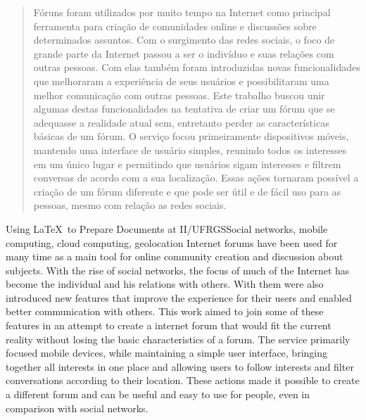 \documentclass[diss]{template/setrem}
\begin{document}
\begin{abstract}
Fóruns foram utilizados por muito tempo na Internet como principal ferramenta para criação de comunidades online e discussões sobre determinados assuntos. Com o surgimento das redes sociais, o foco de grande parte da Internet passou a ser o indivíduo e suas relações com outras pessoas. Com elas também foram introduzidas novas funcionalidades que melhoraram a experiência de seus usuários e possibilitaram uma melhor comunicação com outras pessoas. Este trabalho buscou unir algumas destas funcionalidades na tentativa de criar um fórum que se adequasse a realidade atual sem, entretanto perder as características básicas de um fórum. O serviço focou primeiramente dispositivos móveis, mantendo uma interface de usuário simples, reunindo todos os interesses em um único lugar e permitindo que usuários sigam interesses e filtrem conversas de acordo com a sua localização. Essas ações tornaram possível a criação de um fórum diferente e que pode ser útil e de fácil uso para as pessoas, mesmo com relação as redes sociais.
\end{abstract}


\begin{englishabstract}{Using \LaTeX\ to Prepare Documents at II/UFRGS}{Social networks, mobile computing, cloud computing, geolocation}
Internet forums have been used for many time as a main tool for online community creation and discussion about subjects. With the rise of social networks, the focus of much of the Internet has become the individual and his relations with others. With them were also introduced new features that improve the experience for their users and enabled better communication with others. This work aimed to join some of these features in an attempt to create a internet forum that would fit the current reality without losing the basic characteristics of a forum. The service primarily focused mobile devices, while maintaining a simple user interface, bringing together all interests in one place and allowing users to follow interests and filter conversations according to their location. These actions made it possible to create a different forum and can be useful and easy to use for people, even in comparison with social networks.
\end{englishabstract}
\end{document}
